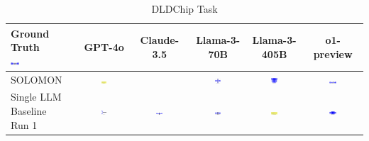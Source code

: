 \begin{table}
  \caption{DLDChip Task}
  \label{table:dldchip}
  \centering
  \begin{tabular}{@{}lccccc@{}}
    \toprule
    \makecell{Ground Truth \\ \includegraphics[width=0.13\textwidth]{examples_png/DLDChip.png}} & GPT-4o & Claude-3.5 & Llama-3-70B & Llama-3-405B & o1-preview \\
    \midrule
    SOLOMON & \includegraphics[width=0.13\textwidth]{./pool_all/png/gpt-4o_results/DLDChip.png} &  & \includegraphics[width=0.13\textwidth]{./pool_all/png/claude-3-5-sonnet-20240620_results/DLDChip.png} & \includegraphics[width=0.13\textwidth]{./pool_all/png/watsonx_meta-llama_llama-3-1-70b-instruct_results/DLDChip.png} & \includegraphics[width=0.13\textwidth]{./pool_all/png/watsonx_meta-llama_llama-3-405b-instruct_results/DLDChip.png} \\
    \makecell{Single LLM \\ Baseline \\ Run 1} & \includegraphics[width=0.13\textwidth]{./run_1/png/gpt-4o_results/DLDChip.png} & \includegraphics[width=0.13\textwidth]{./run_1/png/o1-preview_results/DLDChip.png} & \includegraphics[width=0.13\textwidth]{./run_1/png/claude-3-5-sonnet-20240620_results/DLDChip.png} & \includegraphics[width=0.13\textwidth]{./run_1/png/watsonx_meta-llama_llama-3-1-70b-instruct_results/DLDChip.png} & \includegraphics[width=0.13\textwidth]{./run_1/png/watsonx_meta-llama_llama-3-405b-instruct_results/DLDChip.png} \\

\end{tabular}
\end{table}
